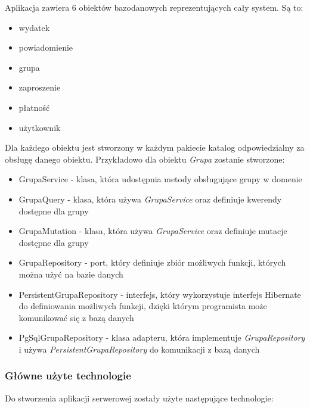 Aplikacja zawiera 6 obiektów bazodanowych reprezentujących cały system. Są to:
\begin{itemize}
  \item wydatek
  \item powiadomienie
  \item grupa
  \item zaproszenie
  \item płatność
  \item użytkownik
\end{itemize}

Dla każdego obiektu jest stworzony w każdym pakiecie katalog odpowiedzialny za obsługę danego obiektu. Przykładowo dla obiektu \emph{Grupa} zostanie stworzone:
\begin{itemize}
  \item GrupaService - klasa, która udostępnia metody obsługujące grupy w domenie
  \item GrupaQuery - klasa, która używa \emph{GrupaService} oraz definiuje kwerendy dostępne dla grupy
  \item GrupaMutation - klasa, która używa \emph{GrupaService} oraz definiuje mutacje dostępne dla grupy
  \item GrupaRepository - port, który definiuje zbiór możliwych funkcji, których można użyć na bazie danych
  \item PersistentGrupaRepository - interfejs, który wykorzystuje interfejs Hibernate do definiowania możliwych funkcji, dzięki którym programista może komunikować się z bazą danych
  \item PgSqlGrupaRepository - klasa adapteru, która implementuje \emph{GrupaRepository} i używa \emph{PersistentGrupaRepository} do komunikacji z bazą danych
\end{itemize}

\subsubsection{Główne użyte technologie}
Do stworzenia aplikacji serwerowej zostały użyte następujące technologie:

